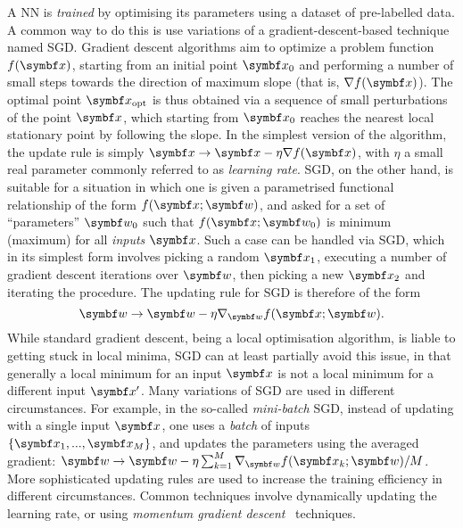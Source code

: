 A \ac{NN} is \emph{trained} by optimising its parameters using a dataset of pre-labelled data.
A common  way to do this is use variations of a gradient-descent-based technique named \ac{SGD}.
Gradient descent algorithms aim to optimize a problem function $f(\bs x)$, starting from an initial point $\bs x_0$ and performing a number of small steps towards the direction of maximum slope (that is, $\grad f(\bs x)$).
The optimal point $\bsx_{\on{opt}}$ is thus obtained via a sequence of small perturbations of the point $\bsx$, which starting from $\bsx_0$ reaches the nearest local stationary point by following the slope.
In the simplest version of the algorithm, the update rule is simply $\bs x \to \bs x - \eta \grad f(\bs x)$, with $\eta$ a small real parameter commonly referred to as \emph{learning rate}.
\ac{SGD}, on the other hand, is suitable for a situation in which one is given a parametrised functional relationship of the form $f(\bs x; \bs w)$, and asked for a set of ``parameters'' $\bs w_0$ such that $f(\bs x; \bs w_0)$ is minimum (maximum) for all \emph{inputs} $\bs x$.
Such a case can be handled via \ac{SGD}, which in its simplest form involves picking a random $\bs x_1$, executing a number of gradient descent iterations over $\bs w$, then picking a new $\bs x_2$ and iterating the procedure.
The updating rule for \ac{SGD} is therefore of the form
\begin{equation}
	\bs w \to \bs w - \eta\grad_{\bs w}f(\bs x;\bs w).
	\label{eq:updating_rule}
\end{equation}
While standard gradient descent, being a local optimisation algorithm, is liable to getting stuck in local minima, \ac{SGD} can at least partially avoid this issue, in that generally a local minimum for an input $\bs x$ is not a local minimum for a different input $\bs x'$.
Many variations of \ac{SGD} are used in different circumstances.
For example, in the so-called \emph{mini-batch} \ac{SGD}, instead of updating with a single input $\bs x$, one uses a \emph{batch} of inputs $\{\bs x_1,...,\bs x_M\}$, and updates the parameters using the averaged gradient:
$\bs w\to\bs w-\eta\sum_{k=1}^M\grad_{\bs w}f(\bs x_k; \bs w)/M$.
More sophisticated updating rules are used to increase the training efficiency in different circumstances.
Common techniques involve dynamically updating the learning rate, or using \emph{momentum gradient descent}~\cite{goh2017momentum,ruder2016overview} techniques.

